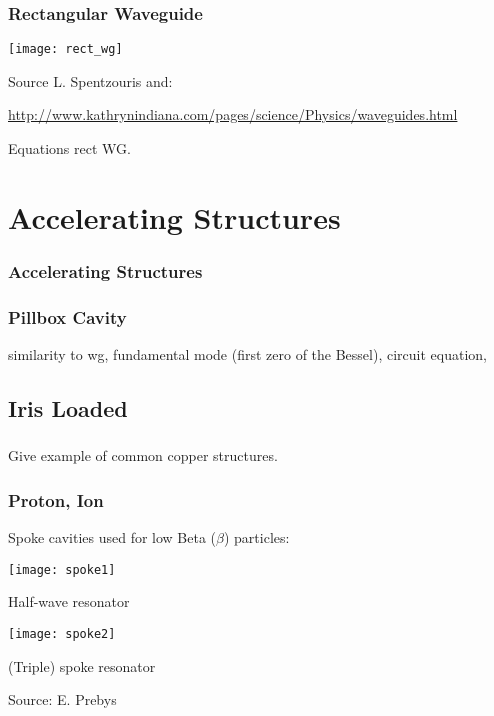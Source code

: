 \documentclass[professionalfonts,t]{beamer}
\begin{document}
\begin{frame}
\frametitle{Rectangular Waveguide}
\begin{center}
	\texttt{[image: rect\_wg]}
\end{center}

Source L. Spentzouris and:

\tiny\url{http://www.kathrynindiana.com/pages/science/Physics/waveguides.html}
\end{frame}

\begin{frame}
	Equations rect WG. 
\end{frame}


\section{Accelerating Structures}
\begin{frame}
\frametitle{Accelerating Structures}

\end{frame}

\begin{frame}
	\frametitle{Pillbox Cavity}
	similarity to wg, fundamental mode (first zero of the Bessel), 
	circuit equation, 
\end{frame}


\subsection{Iris Loaded}
\begin{frame}
	\frametitle{}
	Give example of common copper structures. 
\end{frame}

\begin{frame}
\frametitle{Proton, Ion}
Spoke cavities used for low Beta ($\beta$) particles:
\vspace{0.25em}

\centering
\begin{minipage}{0.45\textwidth}
	\centering
	\texttt{[image: spoke1]}
	
	Half-wave resonator
\end{minipage}\hspace{-1em}
\begin{minipage}{0.5\textwidth}
	\centering
	\texttt{[image: spoke2]}
	
	(Triple) spoke resonator
\end{minipage}

\vspace{1em}
\hfill Source: E. Prebys
\end{frame}
\end{document}
